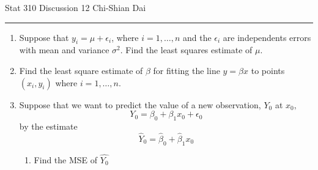 \documentclass[12pt]{article}
\begin{document}
	\noindent Stat 310 \hfill  Discussion 12 \hfill Chi-Shian Dai
\smallskip
	\hrule
\begin{enumerate}
\item Suppose that $y_i=\mu+\epsilon_i$, where $i=1,\dots, n$ and the $\epsilon_i$ are independents errors with mean and variance $\sigma^2.$ Find the least squares estimate of $\mu$.
\vspace{3cm}
\item Find the least square estimate of $\beta$ for fitting the line $y=\beta x$ to points $(x_i,y_i)$ where $i=1,\dots,n.$
\vspace{3cm}
\item Suppose that we want to predict the value of a new observation, $Y_0$ at $x_0,$
$$Y_0=\beta_0+\beta_1x_0+\epsilon_0$$
by the estimate 
$$\hat Y_0=\hat\beta_0+\hat \beta_1x_0$$
\begin{enumerate}
	\item Find the MSE of $\hat{Y_0}$
\end{enumerate}
\end{enumerate}
\end{document}
